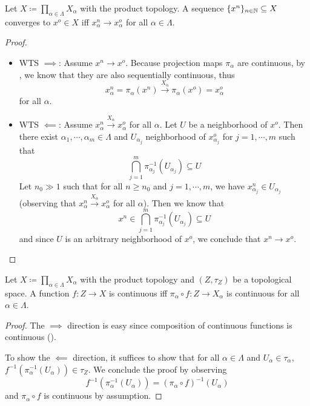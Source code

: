 \documentclass[screen]{techreport}
\numberwithin{equation}{section}
\begin{document}
\begin{lemma}\label{Lem:ProdTopSeqConvergeIffEveryAxisConverge}
	Let $X \coloneqq \prod_{\alpha \in \Lambda} X_\alpha$ with the product topology.
	A sequence $\{x^n\}_{n \in \mathbb{N}} \subseteq X$ converges to $x^o \in X$ iff $x^n_\alpha \rightarrow x^o_\alpha$ for all $\alpha \in \Lambda$.
\end{lemma}
\begin{proof}\
	\begin{itemize}
		\item WTS $\implies$: Assume $x^n \rightarrow x^o$.
		Because projection maps $\pi_\alpha$ are continuous, by , we know that they are also sequentially continuous, thus
		\[
		x^n_\alpha = \pi_\alpha(x^n) \xrightarrow{X_\alpha} \pi_\alpha(x^o) = x^o_\alpha
		\]
		for all $\alpha$.
		
		\item WTS $\impliedby$: Assume $x^n_\alpha \xrightarrow{X_\alpha} x^o_\alpha$ for all $\alpha$.
		Let $U$ be a neighborhood of $x^o$.
		Then there exist $\alpha_1,\cdots,\alpha_m \in \Lambda$ and  $U_{\alpha_j}$ neighborhood of $x^o_{\alpha_j}$ for $j=1,\cdots,m$ such that
		\[
		\bigcap_{j=1}^m \pi_{\alpha_j}^{-1}(U_{\alpha_j}) \subseteq U
		\]
		Let $n_0 \gg 1$ such that for all $n \ge n_0$ and $j=1,\cdots,m$, we have $x^n_{\alpha_j} \in U_{\alpha_j}$ (observing that $x^n_\alpha \xrightarrow{X_\alpha} x^o_\alpha$ for all $\alpha$).
		Then we know that
		\[
		x^n \in \bigcap_{j=1}^m \pi_{\alpha_j}^{-1}(U_{\alpha_j}) \subseteq U
		\]
		and since $U$ is an arbitrary neighborhood of $x^o$, we conclude that $x^n \rightarrow x^o$.
	\end{itemize}
\end{proof}

\begin{lemma}\label{Lem:ProdTopContFuncIffContEveryAxis}
	Let $X \coloneqq \prod_{\alpha \in \Lambda} X_\alpha$ with the product topology and $(Z,\tau_Z)$ be a topological space.
	A function $f :Z \to X$ is continuous iff $\pi_\alpha \circ f : Z \to X_\alpha$ is continuous for all $\alpha \in \Lambda$.
\end{lemma}
\begin{proof}
	The $\implies$ direction is easy since composition of continuous functions is continuous ().
	
	To show the $\impliedby$ direction, it suffices to show that for all $\alpha \in \Lambda$ and $U_\alpha \in \tau_\alpha$, $f^{-1}(\pi_\alpha^{-1}(U_\alpha)) \in \tau_Z$.
	We conclude the proof by observing
	\[
	f^{-1}(\pi_\alpha^{-1}(U_\alpha)) = (\pi_\alpha \circ f)^{-1}(U_\alpha)
	\]
	and $\pi_\alpha \circ f$ is continuous by assumption.
\end{proof}
\end{document}
